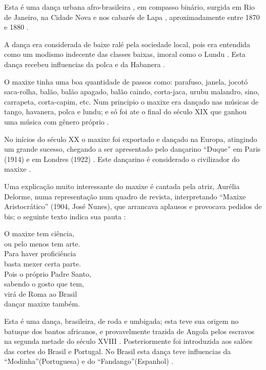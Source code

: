 \begin{definition}[Maxixe:]
Esta é uma dança urbana afro-brasileira \cite[pp. 4]{musicasambavariasdef1}, 
em compasso binário, surgida em Rio de Janeiro, 
na Cidade Nova e nos cabarés de Lapa \cite[pp. 465]{marcondes1977enciclopedia}  \cite[pp. 198]{dourado2004dicionario}, 
aproximadamente entre 1870 e 1880 \cite[pp. 465]{marcondes1977enciclopedia}  \cite[pp. 62]{reinato2010musica}.

A dança era considerada de baixe ralé pela sociedade local, 
pois era entendida como um modismo indecente das classes baixas, imoral como o Lundu \cite[pp. 198]{dourado2004dicionario}.
Esta dança recebeu influencias da polca \cite[pp. 198]{dourado2004dicionario} e da Habanera \cite[pp. 62]{reinato2010musica}.

O maxixe tinha uma boa quantidade de passos como: 
parafuso, 
janela,
jocotó
saca-rolha, 
balão, 
balão apagado,
balão caindo,
corta-jaca,
urubu malandro,
sino, 
carrapeta, 
corta-capim, 
\cite[pp. 465]{marcondes1977enciclopedia} \cite[pp. 68, 129, 131,173]{efege1974maxixe} etc. 
Num principio o maxixe era dançado nas músicas de tango, havanera, polca e lundu; 
e só foi ate o final do século XIX que ganhou uma música com gênero próprio \cite[pp. 465]{marcondes1977enciclopedia}.

No inícios do século XX o maxixe foi exportado e dançado na Europa, atingindo um grande sucesso, 
chegando a ser apresentado pelo dançarino ``Duque'' em Paris (1914) e em Londres (1922) \cite[pp. 465]{marcondes1977enciclopedia}.
Este dançarino é considerado o civilizador do maxixe \cite[pp. 129]{efege1974maxixe}.

Uma explicação muito interessante do maxixe é cantada pela atriz, Aurélia Delorme,
numa representação num quadro de revista, interpretando  ``Maxixe Aristocrático'' (1904, José Nunes), 
que arrancava aplausos e provocava pedidos de bis;
o seguinte texto indica sua pauta \cite[pp. 80-81]{efege1974maxixe} \cite{REIS2003}: 
\begin{citando}
O maxixe tem ciência,\\
ou pelo menos tem arte.\\
Para haver proficiência\\
basta mexer certa parte.\\
Pois o próprio Padre Santo,\\
sabendo o gosto que tem,\\
virá de Roma ao Brasil\\
dançar maxixe também.\\ 
\end{citando}
\end{definition}
\begin{definition}[Lundu:] 
Esta é uma dança, brasileira, de roda e umbigada; esta teve sua origem no batuque dos bantos africanos,
e provavelmente trazida de Angola pelos escravos na segunda metade do século XVIII \cite[pp. 198]{dourado2004dicionario}.
Posteriormente foi introduzida aos salões das cortes do Brasil e Portugal.
No Brasil esta dança teve influencias da ``Modinha''(Portuguesa) e do ``Fandango''(Espanhol) \cite[pp. 198]{dourado2004dicionario}.
\end{definition}


